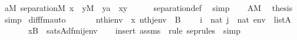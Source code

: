 \begin{isabellebody}
\ {\isachardoublequoteopen}{\isasymforall}a{\isasymin}M{\isachardot}{\kern0pt}\ separation{\isacharparenleft}{\kern0pt}{\isacharhash}{\kern0pt}{\isacharhash}{\kern0pt}M{\isacharcomma}{\kern0pt}\ {\isasymlambda}x\ {\isachardot}{\kern0pt}\ {\isasymforall}y{\isasymin}M\ {\isachardot}{\kern0pt}\ y{\isasymin}a\ {\isasymlongrightarrow}\ x{\isasymin}y{\isacharparenright}{\kern0pt}{\isachardoublequoteclose}\isanewline
\ \ \ \ \isamarkupfalse%
\ separation{\isacharunderscore}{\kern0pt}def\ \isamarkupfalse%
\ simp\isanewline
\ \ \isamarkupfalse%
\ {\isacartoucheopen}A{\isasymin}M{\isacartoucheclose}\ \isamarkupfalse%
\ {\isacharquery}{\kern0pt}thesis\ \isamarkupfalse%
\ simp\isanewline
{}\isamarkupfalse%
%
\endisatagproof
{\isafoldproof}%
%
\isadelimproof
\isanewline
%
\endisadelimproof
\isanewline
\isanewline
\isanewline
{}\isamarkupfalse%
\ diff{\isacharunderscore}{\kern0pt}fm{\isacharunderscore}{\kern0pt}auto{\isacharcolon}{\kern0pt}\isanewline
\ \ \isanewline
\ \ \ \ {\isachardoublequoteopen}nth{\isacharparenleft}{\kern0pt}i{\isacharcomma}{\kern0pt}env{\isacharparenright}{\kern0pt}\ {\isacharequal}{\kern0pt}\ x{\isachardoublequoteclose}\ {\isachardoublequoteopen}nth{\isacharparenleft}{\kern0pt}j{\isacharcomma}{\kern0pt}env{\isacharparenright}{\kern0pt}\ {\isacharequal}{\kern0pt}\ B{\isachardoublequoteclose}\isanewline
\ \ \ \ {\isachardoublequoteopen}i\ {\isasymin}\ nat{\isachardoublequoteclose}\ {\isachardoublequoteopen}j\ {\isasymin}\ nat{\isachardoublequoteclose}\ {\isachardoublequoteopen}env\ {\isasymin}\ list{\isacharparenleft}{\kern0pt}A{\isacharparenright}{\kern0pt}{\isachardoublequoteclose}\isanewline
\ \ \isanewline
\ \ \ \ {\isachardoublequoteopen}x{\isasymnotin}B\ {\isasymlongleftrightarrow}\ sats{\isacharparenleft}{\kern0pt}A{\isacharcomma}{\kern0pt}{\isacharquery}{\kern0pt}dfm{\isacharparenleft}{\kern0pt}i{\isacharcomma}{\kern0pt}j{\isacharparenright}{\kern0pt}{\isacharcomma}{\kern0pt}env{\isacharparenright}{\kern0pt}{\isachardoublequoteclose}\isanewline
%
\isadelimproof
\ \ %
\endisadelimproof
%
\isatagproof
{}\isamarkupfalse%
\ {\isacharparenleft}{\kern0pt}insert\ assms\ {\isacharsemicolon}{\kern0pt}\ {\isacharparenleft}{\kern0pt}rule\ sep{\isacharunderscore}{\kern0pt}rules\ {\isacharbar}{\kern0pt}\ simp{\isacharparenright}{\kern0pt}{\isacharplus}{\kern0pt}{\isacharparenright}{\kern0pt}%
\endisatagproof
{\isafoldproof}%
%
\isadelimproof
\isanewline

\end{isabellebody}

